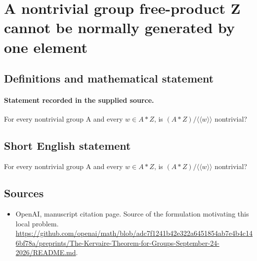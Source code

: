 \documentclass[11pt]{article}
\begin{document}
\section*{A nontrivial group free-product Z cannot be normally generated by one element}\label{30007197}
\subsection{Definitions and mathematical statement}
\paragraph{Statement recorded in the supplied source.}
For every nontrivial group A and every $w\in A*Z$, is $(A*Z)/\langle \langle w\rangle \rangle $ nontrivial?
\subsection{Short English statement}
For every nontrivial group A and every $w\in A*Z$, is $(A*Z)/\langle \langle w\rangle \rangle $ nontrivial?
\subsection{Sources}
\begin{itemize}
\item[S1] OpenAI, manuscript citation page. Source of the formulation motivating this local problem.
\url{https://github.com/openai/math/blob/adc7f1241b42e322a6451854ab7e4b4c146bf78a/preprints/The-Kervaire-Theorem-for-Groups-September-24-2026/README.md}.
\end{itemize}
\end{document}
